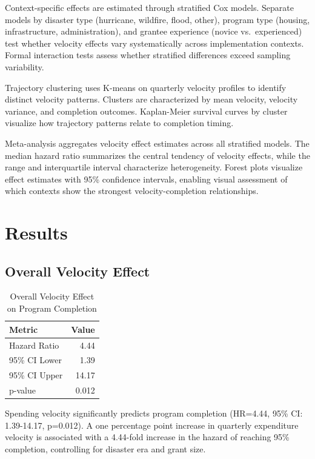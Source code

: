 \documentclass[
  12pt,
  letterpaper,
]{article}
\begin{document}
Context-specific effects are estimated through stratified Cox models.
Separate models by disaster type (hurricane, wildfire, flood, other),
program type (housing, infrastructure, administration), and grantee
experience (novice vs.~experienced) test whether velocity effects vary
systematically across implementation contexts. Formal interaction tests
assess whether stratified differences exceed sampling variability.

Trajectory clustering uses K-means on quarterly velocity profiles to
identify distinct velocity patterns. Clusters are characterized by mean
velocity, velocity variance, and completion outcomes. Kaplan-Meier
survival curves by cluster visualize how trajectory patterns relate to
completion timing.

Meta-analysis aggregates velocity effect estimates across all stratified
models. The median hazard ratio summarizes the central tendency of
velocity effects, while the range and interquartile interval
characterize heterogeneity. Forest plots visualize effect estimates with
95\% confidence intervals, enabling visual assessment of which contexts
show the strongest velocity-completion relationships.

\section{Results}\label{results}

\subsection{Overall Velocity Effect}\label{overall-velocity-effect}

\begin{longtable}[]{@{}lr@{}}

\caption{\label{tbl-overall}Overall Velocity Effect on Program
Completion}

\tabularnewline

\toprule\noalign{}
Metric & Value \\
\midrule\noalign{}
\endhead
\bottomrule\noalign{}
\endlastfoot
Hazard Ratio & 4.44 \\
95\% CI Lower & 1.39 \\
95\% CI Upper & 14.17 \\
p-value & 0.012 \\

\end{longtable}

Spending velocity significantly predicts program completion (HR=4.44,
95\% CI: 1.39-14.17, p=0.012). A one percentage point increase in
quarterly expenditure velocity is associated with a 4.44-fold increase
in the hazard of reaching 95\% completion, controlling for disaster era
and grant size.
\end{document}
